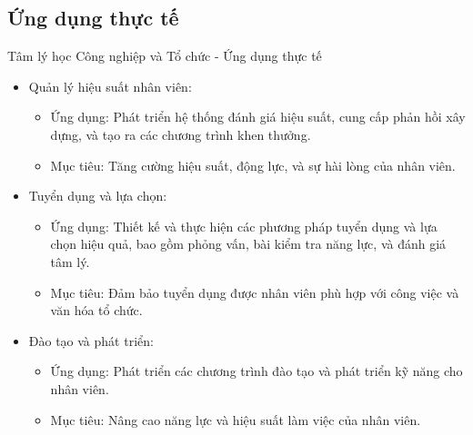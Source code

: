 \documentclass[../main.tex]{subfiles}
\begin{document}
\subsection{Ứng dụng thực tế}
\begin{frame}{Tâm lý học Công nghiệp và Tổ chức - Ứng dụng thực tế}
    \begin{itemize}    
        \item Quản lý hiệu suất nhân viên:
        \begin{itemize}
            \item Ứng dụng: Phát triển hệ thống đánh giá hiệu suất, cung cấp phản hồi xây dựng, và tạo ra các chương trình khen thưởng.
            \item Mục tiêu:  Tăng cường hiệu suất, động lực, và sự hài lòng của nhân viên.
        \end{itemize}

        \item Tuyển dụng và lựa chọn:
        \begin{itemize}
            \item Ứng dụng: Thiết kế và thực hiện các phương pháp tuyển dụng và lựa chọn hiệu quả, bao gồm phỏng vấn, bài kiểm tra năng lực, và đánh giá tâm lý.
            \item Mục tiêu: Đảm bảo tuyển dụng được nhân viên phù hợp với công việc và văn hóa tổ chức.
        \end{itemize}

        \item Đào tạo và phát triển:
        \begin{itemize}
            \item Ứng dụng: Phát triển các chương trình đào tạo và phát triển kỹ năng cho nhân viên.
            \item Mục tiêu: Nâng cao năng lực và hiệu suất làm việc của nhân viên.
        \end{itemize}
    \end{itemize}
\end{frame}
\end{document}
